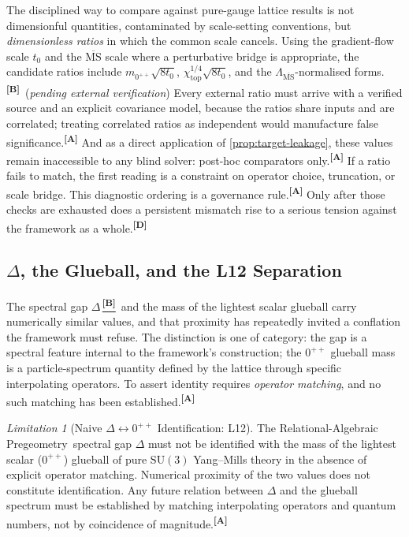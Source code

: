 \documentclass[12pt,a4paper,twoside]{article}
\theoremstyle{plain}
\theoremstyle{definition}
\theoremstyle{remark}
\newtheorem{limitation}[theorem]{Limitation}
\newcommand{\ProjectShort}{Relational-Algebraic Pregeometry}
\newcommand{\RAP}{\ProjectShort}
\newcommand{\catmark}[1]{\textsuperscript{\textsf{\textbf{[#1]}}}}
\newcommand{\Bdelta}{\hyperref[box:pi-override-delta]{\catmark{B}}}
\begin{document}
The disciplined way to compare against pure-gauge lattice results is not
dimensionful quantities, contaminated by scale-setting conventions, but
\emph{dimensionless ratios} in which the common scale cancels. Using the
gradient-flow scale $t_0$ and the $\overline{\mathrm{MS}}$ scale where a
perturbative bridge is appropriate, the candidate ratios include
$m_{0^{++}}\sqrt{8t_0}$, $\chi_{\mathrm{top}}^{1/4}\sqrt{8t_0}$, and the
$\Lambda_{\overline{\mathrm{MS}}}$-normalised forms.\catmark{B}\ (\emph{pending external verification})
Every external ratio must arrive with a verified source and an explicit
covariance model, because the ratios share inputs and are correlated;
treating correlated ratios as independent would manufacture false
significance.\catmark{A} And as a direct application of
\cref{prop:target-leakage}, these values remain inaccessible to any
blind solver: post-hoc comparators only.\catmark{A} If a ratio fails to
match, the first reading is a constraint on operator choice, truncation,
or scale bridge. This diagnostic ordering is a governance rule.\catmark{A}
Only after those checks are exhausted does a persistent mismatch rise to a
serious tension against the framework as a whole.\catmark{D}

\subsection{\texorpdfstring{$\Delta$}{Delta}, the Glueball, and the L12 Separation}
\label{subsec:delta-glueball-l12}

The spectral gap $\Delta$\,\Bdelta\ and the mass of the lightest scalar
glueball carry numerically similar values, and that proximity has
repeatedly invited a conflation the framework must refuse. The
distinction is one of category: the gap is a spectral feature internal
to the framework's construction; the $0^{++}$ glueball mass is a
particle-spectrum quantity defined by the lattice through specific
interpolating operators. To assert identity requires \emph{operator
matching}, and no such matching has been established.\catmark{A}

\begin{limitation}[Naive $\Delta\!\leftrightarrow\!0^{++}$ Identification: L12]
\label{lim:L12}
The \RAP\ spectral gap $\Delta$ must not be identified with the mass of
the lightest scalar ($0^{++}$) glueball of pure $\mathrm{SU}(3)$
Yang--Mills theory in the absence of explicit operator matching.
Numerical proximity of the two values does not constitute
identification. Any future relation between $\Delta$ and the glueball
spectrum must be established by matching interpolating operators and
quantum numbers, not by coincidence of magnitude.\catmark{A}
\end{limitation}
\end{document}
